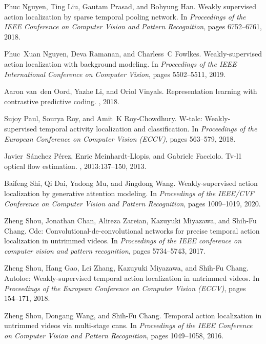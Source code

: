 \documentclass[final]{cvpr}
\begin{document}
\begin{table*}[t]
{\begin{thebibliography}{10}
Phuc Nguyen, Ting Liu, Gautam Prasad, and Bohyung Han.
\newblock Weakly supervised action localization by sparse temporal pooling
  network.
\newblock In {\em Proceedings of the IEEE Conference on Computer Vision and
  Pattern Recognition}, pages 6752--6761, 2018.

Phuc~Xuan Nguyen, Deva Ramanan, and Charless~C Fowlkes.
\newblock Weakly-supervised action localization with background modeling.
\newblock In {\em Proceedings of the IEEE International Conference on Computer
  Vision}, pages 5502--5511, 2019.

Aaron van~den Oord, Yazhe Li, and Oriol Vinyals.
\newblock Representation learning with contrastive predictive coding.
, 2018.

Sujoy Paul, Sourya Roy, and Amit~K Roy-Chowdhury.
\newblock W-talc: Weakly-supervised temporal activity localization and
  classification.
\newblock In {\em Proceedings of the European Conference on Computer Vision
  (ECCV)}, pages 563--579, 2018.

Javier~S{\'a}nchez P{\'e}rez, Enric Meinhardt-Llopis, and Gabriele Facciolo.
\newblock Tv-l1 optical flow estimation.
, 2013:137--150, 2013.

Baifeng Shi, Qi Dai, Yadong Mu, and Jingdong Wang.
\newblock Weakly-supervised action localization by generative attention
  modeling.
\newblock In {\em Proceedings of the IEEE/CVF Conference on Computer Vision and
  Pattern Recognition}, pages 1009--1019, 2020.

Zheng Shou, Jonathan Chan, Alireza Zareian, Kazuyuki Miyazawa, and Shih-Fu
  Chang.
\newblock Cdc: Convolutional-de-convolutional networks for precise temporal
  action localization in untrimmed videos.
\newblock In {\em Proceedings of the IEEE conference on computer vision and
  pattern recognition}, pages 5734--5743, 2017.

Zheng Shou, Hang Gao, Lei Zhang, Kazuyuki Miyazawa, and Shih-Fu Chang.
\newblock Autoloc: Weakly-supervised temporal action localization in untrimmed
  videos.
\newblock In {\em Proceedings of the European Conference on Computer Vision
  (ECCV)}, pages 154--171, 2018.

Zheng Shou, Dongang Wang, and Shih-Fu Chang.
\newblock Temporal action localization in untrimmed videos via multi-stage
  cnns.
\newblock In {\em Proceedings of the IEEE Conference on Computer Vision and
  Pattern Recognition}, pages 1049--1058, 2016.


\end{thebibliography}}
\end{table*}
\end{document}
